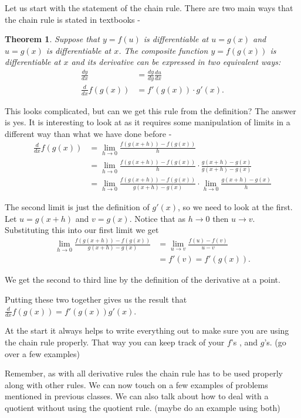 \documentclass[12pt,reqno]{article}
\newtheorem{Theorem}{Theorem}
\theoremstyle{definition}
\begin{document}
Let us start with the statement of the chain rule. There are two main ways that the chain rule is stated in textbooks - 
\begin{Theorem} 
 Suppose that $y = f(u)$ is differentiable at $u = g(x)$ and $u = g(x)$ is differentiable at $x$. The composite function $y = f(g(x))$ is differentiable at $x$ and its derivative can be expressed in two equivalent ways: 
 \begin{align*}
 	\frac{dy}{dx} &= \frac{dy}{dy} \frac{du}{dx} \\ 
	\frac{d}{dx} f(g(x)) &= f'(g(x)) \cdot g'(x). 
\end{align*}
\end{Theorem}

This looks complicated, but can we get this rule from the definition? The answer is yes. It is interesting to look at as it requires some manipulation of limits in a different way than what we have done before - 
\begin{align*}
	\frac{d}{dx} f(g(x)) &= \lim_{h \to 0} \frac{f(g(x + h)) - f(g(x))}{h} \\
						 &= \lim_{h \to 0} \frac{f(g(x + h)) - f(g(x))}{h} \cdot \frac{g(x + h) - g(x)}{g(x + h) - g(x)} \\ 
						 &= \lim_{h \to 0} \frac{f(g(x + h)) - f(g(x))}{g(x + h) - g(x)} \cdot \lim_{h \to 0} \frac{g(x + h) - g(x)}{h} 
\end{align*}

The second limit is just the definition of $g'(x)$, so we need to look at the first. Let $u = g(x + h)$ and $v = g(x)$. Notice that as $h \to 0$ then $u \to v$. Substituting this into our first limit we get
\begin{align*}
	\lim_{h \to 0} \frac{f(g(x + h)) - f(g(x))}{g(x + h) - g(x)} &= \lim_{u \to v} \frac{f(u) - f(v)}{u - v} \\
			&= f'(v) = f'(g(x)).
\end{align*}

We get the second to third line by the definition of the derivative at a point. 

Putting these two together gives us the result that $\frac{d}{dx} f(g(x)) = f'(g(x)) g'(x)$. 


At the start it always helps to write everything out to make sure you are using the chain rule properly. That way you can keep track of your $f$'s , and $g$'s. 
(go over a few examples)

Remember, as with all derivative rules the chain rule has to be used properly along with other rules. We can now touch on a few examples of problems mentioned in previous classes. We can also talk about how to deal with a quotient without using the quotient rule. (maybe do an example using both) 
\end{document}
